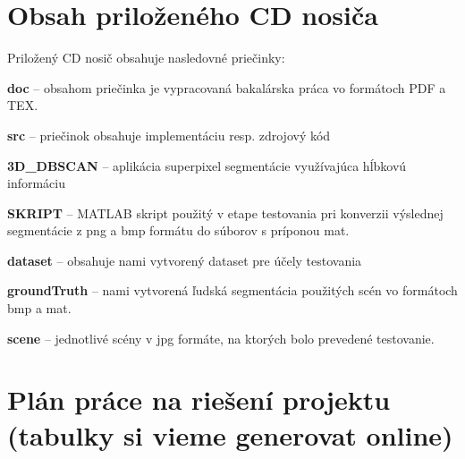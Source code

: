 \newpage
\appendixpagenumbering
\section{Obsah priloženého CD nosiča}
\noindent
Priložený CD nosič obsahuje nasledovné priečinky:
\begin{my_itemize}
	\item \textbf{doc} -- obsahom priečinka je vypracovaná bakalárska práca vo formátoch PDF a TEX.
	\item \textbf{src} -- priečinok obsahuje implementáciu resp. zdrojový kód
	\begin{my_itemize}
	\item \textbf{3D\_DBSCAN} -- aplikácia superpixel segmentácie využívajúca hĺbkovú informáciu
	\item \textbf{SKRIPT} -- MATLAB skript použitý v etape testovania pri konverzii výslednej
 		segmentácie z png a bmp formátu do súborov s príponou mat.
	\end{my_itemize}
	\item \textbf{dataset} -- obsahuje nami vytvorený dataset pre účely testovania 
	\begin{my_itemize}
	\item \textbf{groundTruth} -- nami vytvorená ľudská segmentácia použitých scén vo formátoch bmp a mat.
	\item \textbf{scene} -- jednotlivé scény v jpg formáte, na ktorých bolo prevedené testovanie. 
	\end{my_itemize}
\end{my_itemize}

\newpage
\appendixpagenumbering
\section{Plán práce na riešení projektu (tabulky si vieme generovat online)}

